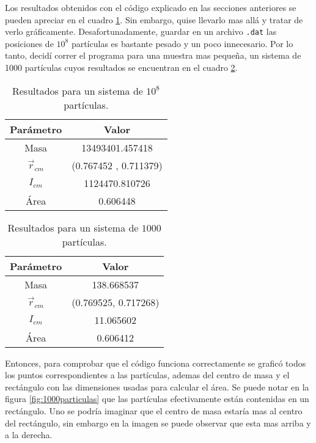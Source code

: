 \documentclass[12pt]{article}
\begin{document}
Los resultados obtenidos con el código explicado en las secciones anteriores se pueden apreciar en el cuadro \ref{tab:108particulas}. Sin embargo, quise llevarlo mas allá y tratar de verlo gráficamente. Desafortunadamente, guardar en un archivo \verb|.dat| las posiciones de $10^8$ partículas es bastante pesado y un poco innecesario. Por lo tanto, decidí correr el programa para una muestra mas pequeña, un sistema de 1000 partículas cuyos resultados se encuentran en el cuadro \ref{tab:1000particulas}. \\
 
 \begin{table}[h!]
     \centering
     \begin{tabular}{|c|c|} \hline
\textbf{Parámetro} & \textbf{Valor} \\ \hline
Masa              & 13493401.457418 \\ \hline
$\vec{r}_{cm}$          & (0.767452 , 0.711379) \\ \hline
$I_{cm}$          & 1124470.810726 \\ \hline
Área              & 0.606448 \\ \hline
     \end{tabular}
     \caption{Resultados para un sistema de $10^8$ partículas.}
     \label{tab:108particulas}
 \end{table}


  \begin{table}[h!]
     \centering
     \begin{tabular}{|c|c|} \hline
\textbf{Parámetro} & \textbf{Valor} \\ \hline
Masa              & 138.668537 \\ \hline
$\vec{r}_{cm}$         & (0.769525, 0.717268) \\ \hline
$I_{cm}$          & 11.065602 \\ \hline
Área              & 0.606412 \\ \hline
     \end{tabular}
     \caption{Resultados para un sistema de $1000$ partículas.}
     \label{tab:1000particulas}
 \end{table}

Entonces, para comprobar que el código funciona correctamente se graficó todos los puntos correspondientes a las partículas, ademas del centro de masa y el rectángulo con las dimensiones usadas para calcular el área. Se puede notar en la figura \ref{fig:1000particulas} que las partículas efectivamente están contenidas en un rectángulo. Uno se podría imaginar que el centro de masa estaría mas al centro del rectángulo, sin embargo en la imagen se puede observar que esta mas arriba y a la derecha.  \\
\end{document}
